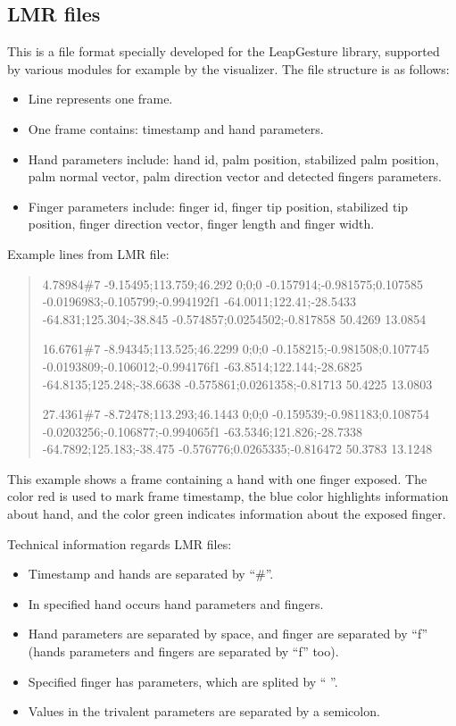 \subsection{LMR files}
This is a file format specially developed for the LeapGesture library, supported by various modules for example by the visualizer. The file structure is as follows:
\begin{itemize}
\item Line represents one frame.
\item One frame contains: timestamp and hand parameters.
\item Hand parameters include: hand id, palm position, stabilized palm position, palm normal vector, palm direction vector and detected fingers parameters.
\item Finger parameters include: finger id, finger tip position, stabilized tip position, finger direction vector, finger length and finger width.
\end{itemize}

Example lines from LMR file:
\begin{quote}
{\color{red}4.78984}\#{\color{blue}7 -9.15495;113.759;46.292 0;0;0 -0.157914;-0.981575;0.107585 -0.0196983;-0.105799;-0.994192}f1 {\color{green} -64.0011;122.41;-28.5433 -64.831;125.304;-38.845 -0.574857;0.0254502;-0.817858 50.4269 13.0854}

{\color{red}16.6761}\#{\color{blue}7 -8.94345;113.525;46.2299 0;0;0 -0.158215;-0.981508;0.107745 -0.0193809;-0.106012;-0.994176}f1 {\color{green} -63.8514;122.144;-28.6825 -64.8135;125.248;-38.6638 -0.575861;0.0261358;-0.81713 50.4225 13.0803}

{\color{red}27.4361}\#{\color{blue}7 -8.72478;113.293;46.1443 0;0;0 -0.159539;-0.981183;0.108754 -0.0203256;-0.106877;-0.994065}f1 {\color{green} -63.5346;121.826;-28.7338 -64.7892;125.183;-38.475 -0.576776;0.0265335;-0.816472 50.3783 13.1248}
\end{quote}

This example shows a frame containing a hand with one finger exposed. The color red is used to mark frame timestamp, the blue color 
highlights information about hand, and the color green indicates information about the exposed finger.


Technical information regards LMR files:
\begin{itemize}
\item Timestamp and hands are separated by ``\#''. 
\item In specified hand occurs hand parameters and fingers. 
\item Hand parameters are separated by space, and finger are separated by ``f'' (hands parameters and fingers are separated by ``f'' too). 
\item Specified finger has parameters, which are splited by `` ''. 
\item Values in the trivalent parameters are separated by a semicolon.
\end{itemize}

